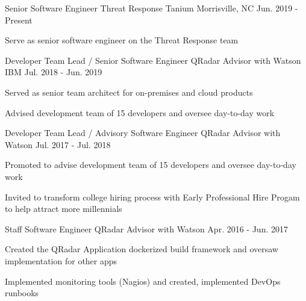 
\begin{cventries}

  \cventry
    {Senior Software Engineer \enskip\textendash\enskip Threat Response} %
    {Tanium} %
    {Morrisville, NC} %
    {Jun. 2019 - Present} %
    {
      \begin{cvitems}
        \item {Serve as senior software engineer on the Threat Response team}
      \end{cvitems}
    }

  \cventry
    {Developer Team Lead / Senior Software Engineer \enskip\textendash\enskip QRadar Advisor with Watson} %
    {IBM} %
    {} %
    {Jul. 2018 - Jun. 2019} %
    {
      \begin{cvitems}
        \item {Served as senior team architect for on-premises and cloud products}
        \item {Advised development team of 15 developers and oversee day-to-day work}
      \end{cvitems}
    }
    
  \cventry
    {Developer Team Lead / Advisory Software Engineer \enskip\textendash\enskip QRadar Advisor with Watson} %
    {} %
    {} %
    {Jul. 2017 - Jul. 2018} %
    {
      \begin{cvitems}
        \item {Promoted to advise development team of 15 developers and oversee day-to-day work}
        \item {Invited to transform college hiring process with Early Professional Hire Progam to help attract more millennials}
      \end{cvitems}
    }

  \cventry
    {Staff Software Engineer \enskip\textendash\enskip QRadar Advisor with Watson}
    {}
    {} %
    {Apr. 2016 - Jun. 2017}
    {
      \begin{cvitems}
        \item {Created the QRadar Application dockerized build framework and oversaw implementation for other apps}
        \item {Implemented monitoring tools (Nagios) and created, implemented DevOps runbooks}
      \end{cvitems}
    }
            

\end{cventries}
